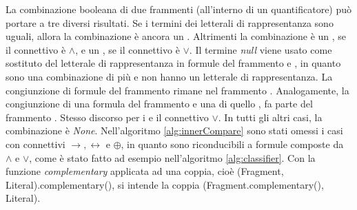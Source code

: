 \documentclass[./main.tex]{subfiles}
\begin{document}
La combinazione booleana di due frammenti \ob (all'interno di un quantificatore) può portare 
a tre diversi risultati.
Se i termini dei letterali di rappresentanza sono uguali, allora la combinazione è ancora un \ob. Altrimenti 
la combinazione è un \cb, se il connettivo è $\land$, e un \dbb, se il connettivo è $\lor$. 
Il termine \textit{null} viene usato come sostituto del letterale di rappresentanza in formule del frammento \cb e \dbb, in quanto 
sono una combinazione di più \ob e non hanno un letterale di rappresentanza.
La congiunzione di formule del frammento \cb rimane nel frammento \cb.
Analogamente, la congiunzione di una formula del frammento \ob e una di quello \cb,
fa parte del frammento \cb.
Stesso discorso per i \dbb e il connettivo $\lor$.
In tutti gli altri casi, la combinazione è \textit{None}. 
Nell'algoritmo \ref{alg:innerCompare} sono stati omessi i casi con connettivi $\rightarrow, \leftrightarrow$ e $\oplus$, 
in quanto sono riconducibili a formule composte da $\land$ e $\lor$, come è stato fatto ad esempio nell'algoritmo \ref{alg:classifier}.
Con la funzione \textit{complementary} applicata ad una coppia, cioè (Fragment, Literal).complementary(), si intende la coppia (Fragment.complementary(), Literal).
\end{document}

